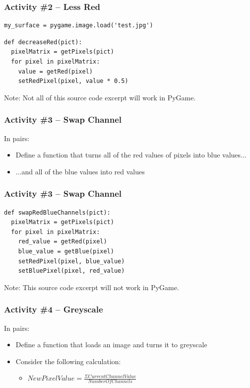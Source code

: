 \begin{frame}[fragile]
	\frametitle{Activity \#2 -- Less Red}

\begin{lstlisting}
my_surface = pygame.image.load('test.jpg')
\end{lstlisting}

\vspace{0.5em}

	
\begin{lstlisting}
def decreaseRed(pict):
  pixelMatrix = getPixels(pict)
  for pixel in pixelMatrix:
    value = getRed(pixel)
    setRedPixel(pixel, value * 0.5)
\end{lstlisting}

Note: Not all of this source code excerpt will work in PyGame.

\end{frame}

\begin{frame}
	\frametitle{Activity \#3 -- Swap Channel}
	
	In pairs:
	
	\vspace{2em}
	
	\begin{itemize}
		\item Define a function that turns all of the red values of pixels into blue values...
		\item ...and all of the blue values into red values
	\end{itemize}
\end{frame}

\begin{frame}[fragile]
	\frametitle{Activity \#3 -- Swap Channel}
	
\begin{lstlisting}
def swapRedBlueChannels(pict):
  pixelMatrix = getPixels(pict)
  for pixel in pixelMatrix:
    red_value = getRed(pixel)
    blue_value = getBlue(pixel)
    setRedPixel(pixel, blue_value)
    setBluePixel(pixel, red_value)
\end{lstlisting}

Note: This source code excerpt will not work in PyGame.

\end{frame}

\begin{frame}
	\frametitle{Activity \#4 -- Greyscale}
	
	In pairs:
	
	\vspace{2em}
	
	\begin{itemize}
		\item Define a function that loads an image and turns it to greyscale
		\item Consider the following calculation:
		\begin{itemize}
			\item $New Pixel Value = \frac{\Sigma Current Channel Value}{Number Of Channels}$
		\end{itemize}
	\end{itemize}
\end{frame}

